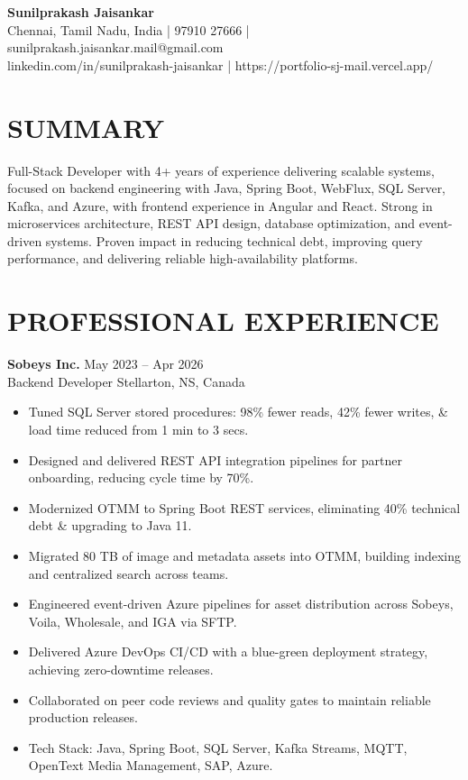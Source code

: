 \documentclass[10pt]{article}
\newcommand{\expentry}[4]{
\textbf{#1} \hfill #2 \\
#3 \hfill #4
}
\begin{document}
{\Large\textbf{Sunilprakash Jaisankar}}\\[2pt]
Chennai, Tamil Nadu, India \;| 97910 27666 \;|\; sunilprakash.jaisankar.mail@gmail.com \\linkedin.com/in/sunilprakash-jaisankar \;|\; https://portfolio-sj-mail.vercel.app/

\section*{SUMMARY}
Full-Stack Developer with 4+ years of experience delivering scalable systems, focused on backend engineering with Java, Spring Boot, WebFlux, SQL Server, Kafka, and Azure, with frontend experience in Angular and React. Strong in microservices architecture, REST API design, database optimization, and event-driven systems. Proven impact in reducing technical debt, improving query performance, and delivering reliable high-availability platforms.


\section*{PROFESSIONAL EXPERIENCE}
\expentry{Sobeys Inc.}{May 2023 -- Apr 2026}{Backend Developer}{Stellarton, NS, Canada}
\begin{itemize}
  \item Tuned SQL Server stored procedures: 98\% fewer reads, 42\% fewer writes, \& load time reduced from 1 min to 3 secs.
  \item Designed and delivered REST API integration pipelines for partner onboarding, reducing cycle time by 70\%.
  \item Modernized OTMM to Spring Boot REST services, eliminating 40\% technical debt \& upgrading to Java 11.
  \item Migrated 80 TB of image and metadata assets into OTMM, building indexing and centralized search across teams.
  \item Engineered event-driven Azure pipelines for asset distribution across Sobeys, Voila, Wholesale, and IGA via SFTP.
  \item Delivered Azure DevOps CI/CD with a blue-green deployment strategy, achieving zero-downtime releases.
  \item Collaborated on peer code reviews and quality gates to maintain reliable production releases.
  \item Tech Stack: Java, Spring Boot, SQL Server, Kafka Streams, MQTT, OpenText Media Management, SAP, Azure.
\end{itemize}
\end{document}
